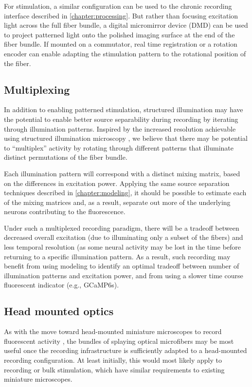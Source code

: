 For stimulation, a similar configuration can be 
used to the chronic recording interface described 
in \cref{chapter:processing}. But rather than 
focusing excitation light across the full fiber  
bundle, a digital micromirror device (DMD) can be 
used to project patterned light onto the polished 
imaging surface at the end of the fiber bundle. 
If mounted on a commutator, real time registration 
or a rotation encoder can enable adapting the 
stimulation pattern to the rotational position of 
the fiber.

\subsection{Multiplexing}

In addition to enabling patterned stimulation, 
structured illumination may have the potential 
to enable better source separability during 
recording by iterating through illumination 
patterns. Inspired by the increased resolution 
achievable using structured illumination 
microscopy
\cite{Gustafsson:2000wj,Gustafsson:2005hg,Saxena:2015fm},
we believe that there may be potential 
to ``multiplex'' activity by rotating through 
different patterns that illuminate distinct 
permutations of the fiber bundle. 

Each illumination pattern will correspond with a 
distinct mixing matrix, based on the differences 
in excitation power. Applying the same source 
separation techniques described in 
\cref{chapter:modeling}, it should be possible 
to estimate each of the mixing matrices and, as 
a result, separate out more of the underlying 
neurons contributing to the fluorescence.

Under such a multiplexed recording paradigm, there 
will be a tradeoff between decreased overall 
excitation (due to illuminating only a subset of the 
fibers) and less temporal resolution (as some 
neural activity may be lost in the time before 
returning to a specific illumination pattern. 
As a result, such recording may benefit from using 
modeling to identify an optimal tradeoff between 
number of illumination patterns and excitation 
power, and from using a slower time course 
fluorescent indicator (e.g., GCaMP6s).

\subsection{Head mounted optics}

As with the move toward head-mounted miniature 
microscopes to record fluorescent activity 
\cite{Ghosh:2011ee,Cai:2016hm,LibertiIII:2017df}, 
the bundles of splaying optical microfibers may 
be most useful once the recording infrastructure 
is sufficiently adapted to a head-mounted 
recording configuration. At least initially, this 
would most likely apply to recording or bulk 
stimulation, which have similar requirements to 
existing miniature microscopes. 

